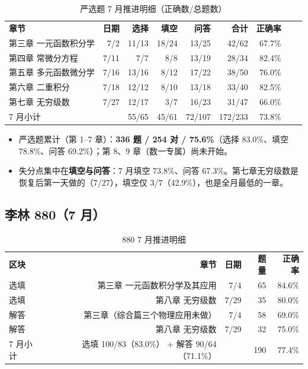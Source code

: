 \documentclass[12pt,a4paper]{ctexart}
\begin{document}
\begin{table}[H]
\footnotesize
\centering
\begin{tabular}{lrrrrrrrr}
\hline
\rowcolor{headerbg}\textcolor{headerfg}{\textbf{章节}} & \textcolor{headerfg}{\textbf{日期}} & \textcolor{headerfg}{\textbf{选择}} & \textcolor{headerfg}{\textbf{填空}} & \textcolor{headerfg}{\textbf{问答}} & \textcolor{headerfg}{\textbf{合计}} & \textcolor{headerfg}{\textbf{正确率}} & \\
第三章 一元函数积分学 & 7/2 & 11/13 & 18/24 & 13/25 & 42/62 & \cellcolor{redrate}67.7\% & \\
第四章 常微分方程 & 7/11 & 7/7 & 8/8 & 13/19 & 28/34 & \cellcolor{greenrate}82.4\% & \\
第五章 多元函数微分学 & 7/16 & 13/16 & 8/12 & 17/22 & 38/50 & \cellcolor{yellowrate}76.0\% & \\
第六章 二重积分 & 7/18 & 12/12 & 8/10 & 13/18 & 33/40 & \cellcolor{greenrate}82.5\% & \\
第七章 无穷级数 & 7/27 & 12/17 & 3/7 & 16/23 & 31/47 & \cellcolor{redrate}66.0\% & \\
\rowcolor{grayrow}7 月小计 & & 55/65 & 45/61 & 72/107 & 172/233 & 73.8\% & \\
\hline
\end{tabular}
\caption{严选题 7 月推进明细（正确数/总题数）}
\end{table}

\begin{itemize}
\item 严选题累计（第 1--7 章）：\textbf{336 题 / 254 对 / 75.6\%}（选择 83.0\%、填空 78.8\%、问答 69.2\%）；第 8、9 章（数一专属）尚未开始。
\item 失分点集中在\textbf{填空与问答}：7 月填空 73.8\%、问答 67.3\%。第七章无穷级数是恢复后第一天做的（7/27），填空仅 3/7（42.9\%），也是全月最低的一章。
\end{itemize}

\subsection{李林 880（7 月）}

\begin{table}[H]
\footnotesize
\centering
\begin{tabular}{lrrrr}
\hline
\rowcolor{headerbg}\textcolor{headerfg}{\textbf{区块}} & \textcolor{headerfg}{\textbf{章节}} & \textcolor{headerfg}{\textbf{日期}} & \textcolor{headerfg}{\textbf{题量}} & \textcolor{headerfg}{\textbf{正确率}} \\
选填 & 第三章 一元函数积分学及其应用 & 7/4 & 65 & \cellcolor{greenrate}84.6\% \\
选填 & 第八章 无穷级数 & 7/29 & 35 & \cellcolor{greenrate}80.0\% \\
解答 & 第三章（综合篇三个物理应用未做） & 7/4 & 58 & \cellcolor{redrate}69.0\% \\
解答 & 第八章 无穷级数 & 7/29 & 32 & \cellcolor{yellowrate}75.0\% \\
\rowcolor{grayrow}7 月小计 & 选填 100/83（83.0\%） + 解答 90/64（71.1\%） & & 190 & 77.4\% \\
\hline
\end{tabular}
\caption{880 7 月推进明细}
\end{table}
\end{document}
